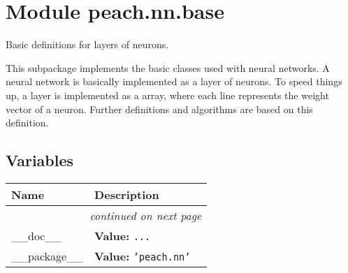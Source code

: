 %
%
%


\section{Module peach.nn.base}

    \label{peach:nn:base}

Basic definitions for layers of neurons.

This subpackage implements the basic classes used with neural networks. A neural
network is basically implemented as a layer of neurons. To speed things up, a
layer is implemented as a array, where each line represents the weight vector
of a neuron. Further definitions and algorithms are based on this definition.


  \subsection{Variables}

    \vspace{-1cm}
\hspace{\varindent}\begin{longtable}{|p{\varnamewidth}|p{\vardescrwidth}|l}
\cline{1-2}
\cline{1-2} \centering \textbf{Name} & \centering \textbf{Description}& \\
\cline{1-2}
\endhead\cline{1-2}\multicolumn{3}{r}{\small\textit{continued on next page}}\\\endfoot\cline{1-2}
\endlastfoot\raggedright \_\-\_\-d\-o\-c\-\_\-\_\- & \raggedright \textbf{Value:} 
{\tt \texttt{...}}&\\
\cline{1-2}
\raggedright \_\-\_\-p\-a\-c\-k\-a\-g\-e\-\_\-\_\- & \raggedright \textbf{Value:} 
{\tt \texttt{'}\texttt{peach.nn}\texttt{'}}&\\
\cline{1-2}
\end{longtable}


